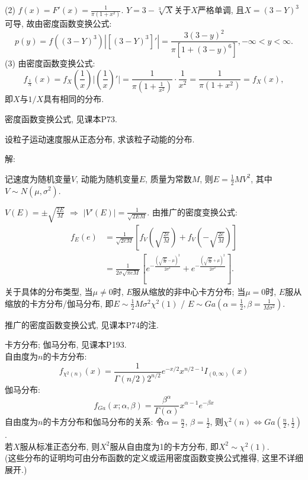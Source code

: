 \documentclass[standard]{ExBook}
\renewenvironment{shaded}{%
  \def\FrameCommand{\fboxsep=\FrameSep \colorbox{shadecolor}}%
  \MakeFramed{\advance\hsize-\width \FrameRestore}%
}{%
  \endMakeFramed
}
\begin{document}
\begin{qitems}
(2) $f(x)=F'(x)=\displaystyle\frac{1}{\pi(1+x^2)}$. $Y=3-\sqrt[3]{X}$关于$X$严格单调, 且$X=(3-Y)^{3}$可导, 故由密度函数变换公式:
$$p(y)=f((3-Y)^{3})|[(3-Y)^{3}]'|=\frac{3(3-y)^2}{\pi[1+(3-y)^6]},-\infty < y < \infty.$$
(3) 由密度函数变换公式:
$$f_{\frac{1}{X}}(x)=f_{X}(\frac{1}{x})\bigg|\left(\frac{1}{x}\right)'\bigg|=\frac{1}{\pi(1+\frac{1}{x^2})}\cdot\frac{1}{x^2}=\frac{1}{\pi(1+x^2)}=f_{X}(x),$$
即$X$与$1/X$具有相同的分布.

\textcolor{themeColor}{\selectfont {} 密度函数变换公式, 见课本P73.}

\vspace{2.5cm-5em}

    \begin{bbox}
    \begin{shaded}
        \qitem
设粒子运动速度服从正态分布, 求该粒子动能的分布.
    \end{shaded}
    \end{bbox}

\vspace{\dimexpr2.5cm-5em\relax}

解:

记速度为随机变量$V$, 动能为随机变量$E$, 质量为常数$M$, 则$E=\frac{1}{2}M V^2$, 其中$V\sim N(\mu,\sigma^2)$.

$V(E)=\pm\sqrt{\displaystyle\frac{2E}{M}}$ $\Longrightarrow$ $|V'(E)|=\displaystyle\frac{1}{\sqrt{2EM}}$. 由推广的密度变换公式:
$$
\begin{aligned}
f_{E}(e)&=\displaystyle\frac{1}{\sqrt{2eM}}\left[f_{V}\left(\sqrt{\frac{2e}{M}}\right)+f_{V}\left(-\sqrt{\frac{2e}{M}}\right)\right]\\
&=\frac{1}{2\sigma\sqrt{\pi eM}}
\left[
e^{-\frac{\left(\sqrt{\frac{2e}{M}}-\mu\right)^2}{2\sigma^2}}
+
e^{-\frac{\left(\sqrt{\frac{2e}{M}}+\mu\right)^2}{2\sigma^2}}
\right].
\end{aligned}
$$
关于具体的分布类型, 当$\mu\neq0$时, $E$服从缩放的非中心卡方分布; 当$\mu=0$时, $E$服从缩放的卡方分布/伽马分布, 即$E\sim\frac{1}{2}M \sigma^2 \chi^{2}(1)$ / $E\sim Ga(\alpha=\frac{1}{2}, \beta=\frac{1}{M\sigma^2})$.

\textcolor{themeColor}{\selectfont {} 推广的密度函数变换公式, 见课本P74的注.}

\textcolor{themeColor}{\selectfont {} 卡方分布; 伽马分布, 见课本P193.\\
自由度为$n$的卡方分布:
$$f_{\chi^{2}(n)}(x)=\displaystyle\frac{1}{\Gamma(n/2) 2^{n/2}}e^{-x/2}x^{n/2-1}I_{(0,\infty)}(x)$$
伽马分布:
$$f_{Ga}(x;\alpha,\beta)=\frac{\beta^{\alpha}}{\Gamma(\alpha)}x^{\alpha-1}e^{-\beta x}$$
自由度为$n$的卡方分布和伽马分布的关系: 令$\alpha=\frac{n}{2}$, $\beta=\frac{1}{2}$, 则$\chi^{2}(n)\Longleftrightarrow Ga(\frac{n}{2},\frac{1}{2})$.\\
若$X$服从标准正态分布, 则$X^{2}$服从自由度为1的卡方分布, 即$X^{2}\sim\chi^{2}(1)$.\\
(这些分布的证明均可由分布函数的定义或运用密度函数变换公式推得, 这里不详细展开.)}


\end{qitems}
\end{document}
